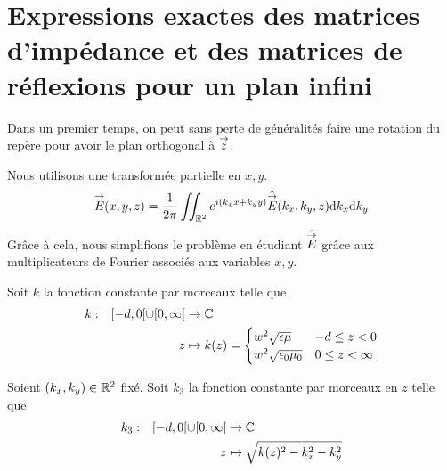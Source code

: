 \section{Expressions exactes des matrices d'impédance et des matrices de réflexions pour un plan infini}

    Dans un premier temps, on peut sans perte de généralités faire une rotation du repère pour avoir le plan orthogonal à \(\vect{z}\).
    \begin{figure}[!h]
        \begin{center}
            \begin{tikzpicture}
                
            \end{tikzpicture}
        \end{center}
    \end{figure}
    Nous utilisons une transformée partielle en \(x, y\).
    \begin{equation*}
        \vE(x,y,z) = \frac{1}{2\pi}\iint_{\RR^2} e^{i(k_x x + k_y y)}\hat{\vE} (k_x,k_y,z) \dd{k_x}\dd{k_y}
    \end{equation*}
    Grâce à cela, nous simplifions le problème en étudiant \( \hat{\vE}\) grâce aux multiplicateurs de Fourier associés aux variables \(x,y\). 

    Soit \(k\) la fonction constante par morceaux telle que
    \begin{equation*}
    \fonction{k}{[-d,0[\cup[0,\infty[}{\CC}
          {z}{k(z)=\begin{cases} w^2\sqrt{\eps\mu} & -d \le z < 0 \\ w^2\sqrt{\eps_0\mu_0} & 0\le z < \infty\end{cases}}
    \end{equation*}

    \begin{defn}
        Soient \((k_x,k_y) \in \RR^2\) fixé.
        Soit \(k_3\) la fonction constante par morceaux en \(z\) telle que
        \begin{equation*}
          \fonction{k_3}{[-d,0[\cup[0,\infty[}{\CC}
          {z}{\sqrt{k(z)^2 - k_x^2 - k_y^2}}
        \end{equation*}
    \end{defn}

